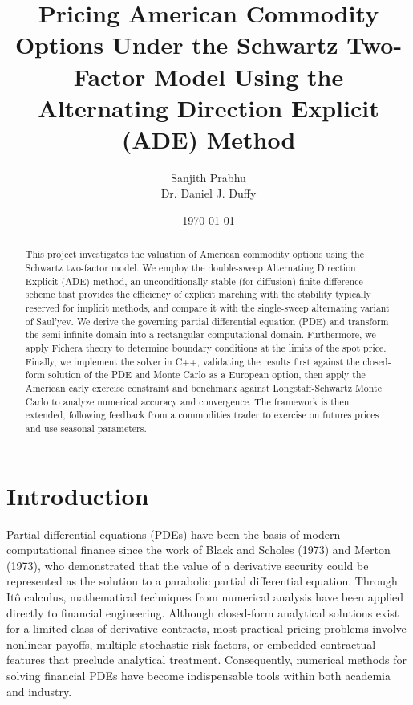 \documentclass[12pt,a4paper]{article}
\title{Pricing American Commodity Options Under the Schwartz Two-Factor Model Using the Alternating Direction Explicit (ADE) Method}
\author{Sanjith Prabhu \\ Dr. Daniel J. Duffy}
\date{\today}
\begin{document}
\maketitle
\newpage
\begin{abstract} \normalsize
This project investigates the valuation of American commodity options using the Schwartz two-factor model. We employ the double-sweep Alternating Direction Explicit (ADE) method, an unconditionally stable (for diffusion) finite difference scheme that provides the efficiency of explicit marching with the stability typically reserved for implicit methods, and compare it with the single-sweep alternating variant of Saul'yev. We derive the governing partial differential equation (PDE) and transform the semi-infinite domain into a rectangular computational domain. Furthermore, we apply Fichera theory to determine boundary conditions at the limits of the spot price. Finally, we implement the solver in C++, validating the results first against the closed-form solution of the PDE and Monte Carlo as a European option, then apply the American early exercise constraint and benchmark against Longstaff-Schwartz Monte Carlo to analyze numerical accuracy and convergence. The framework is then extended, following feedback from a commodities trader to exercise on futures prices and use seasonal parameters.
\end{abstract}

\newpage
\tableofcontents

\newpage
{}

\section{Introduction}\label{ch:intro}
Partial differential equations (PDEs) have been the basis of modern computational finance since the work of Black and Scholes (1973) and Merton (1973), who demonstrated that the value of a derivative security could be represented as the solution to a parabolic partial differential equation. Through It\^o calculus, mathematical techniques from numerical analysis have been applied directly to financial engineering. Although closed-form analytical solutions exist for a limited class of derivative contracts, most practical pricing problems involve nonlinear payoffs, multiple stochastic risk factors, or embedded contractual features that preclude analytical treatment. Consequently, numerical methods for solving financial PDEs have become indispensable tools within both academia and industry.\\
\end{document}
